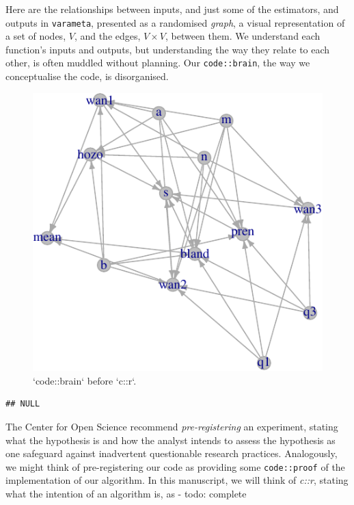 \documentclass[
]{article}
\begin{document}
Here are the relationships between inputs, and just some of the
estimators, and outputs in \texttt{varameta}, presented as a randomised
\emph{graph}, a visual representation of a set of nodes, \(V\), and the
edges, \(V \times V\), between them. We understand each function's
inputs and outputs, but understanding the way they relate to each other,
is often muddled without planning. Our \texttt{code::brain}, the way we
conceptualise the code, is disorganised.

\begin{figure}

{\centering \includegraphics{when-is-done-done_files/figure-latex/codebrain-1} 

}

\caption{`code::brain` before `c::r`.}\label{fig:codebrain}
\end{figure}

\begin{verbatim}
## NULL
\end{verbatim}

The Center for Open Science recommend \emph{pre-registering} an
experiment, stating what the hypothesis is and how the analyst intends
to assess the hypothesis as one safeguard against inadvertent
questionable research practices. Analogously, we might think of
pre-registering our code as providing some \texttt{code::proof} of the
implementation of our algorithm. In this manuscript, we will think of
\emph{c::r}, stating what the intention of an algorithm is, as - todo:
complete
\end{document}
